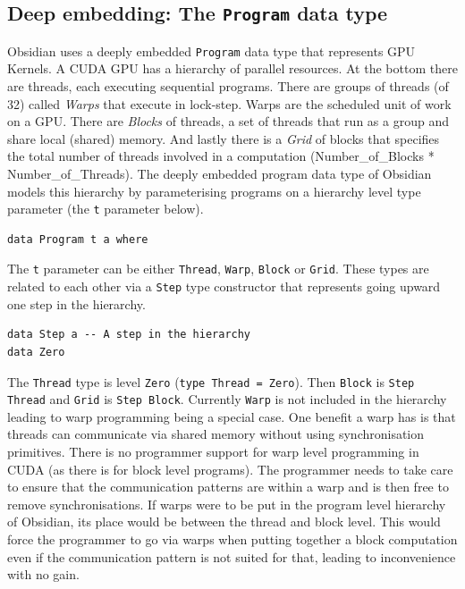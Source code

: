 \documentclass[a4paper]{book}
\begin{document}
\subsection{Deep embedding: The {\tt Program} data type}

Obsidian uses a deeply embedded {\tt Program} data type that represents GPU Kernels. 
A CUDA GPU has a hierarchy of parallel resources. At the bottom there are threads, each 
executing sequential programs. There are groups of threads (of 32) called {\em Warps} that 
execute in lock-step. Warps are the scheduled unit of work on a GPU. There are {\em Blocks} 
of threads, a set of threads that run as a group and share local (shared) memory. And 
lastly there is a {\em Grid} of blocks that specifies the total number of threads involved 
in a computation (Number\_of\_Blocks * Number\_of\_Threads). The deeply embedded program 
data type of Obsidian models this hierarchy by parameterising programs on a hierarchy 
level type parameter (the  {\tt t} parameter below).

\begin{verbatim} 
data Program t a where
\end{verbatim}

The {\tt t} parameter can be either {\tt Thread}, {\tt Warp}, {\tt Block} or {\tt Grid}.
These types are related to each other via a {\tt Step} type constructor that represents 
going upward one step in the hierarchy. 

\begin{verbatim} 
data Step a -- A step in the hierarchy
data Zero
\end{verbatim} 

The {\tt Thread} type is level {\tt Zero} ({\tt type Thread = Zero}). Then {\tt Block} is 
{\tt Step Thread} and {\tt Grid} is {\tt Step Block}. Currently {\tt Warp} is not included 
in the hierarchy leading to warp programming being a special case. One benefit a warp has is 
that threads can communicate via shared memory without using synchronisation primitives. There 
is no programmer support for warp level programming in CUDA (as there is for block level 
programs). The programmer needs to take care to ensure that the communication patterns are 
within a warp and is then free to remove synchronisations. If warps were to be put in the 
program level hierarchy of Obsidian, its place would be between the thread and block level. 
This would force the programmer to go via warps when putting together a block computation even 
if the communication pattern is not suited for that, leading to inconvenience with no gain. 
\end{document}
